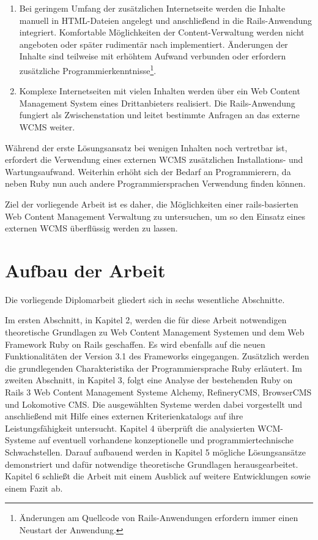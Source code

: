 \begin{enumerate}
\item{
Bei geringem Umfang der zusätzlichen Internetseite werden die Inhalte manuell in HTML-Dateien angelegt und anschließend in die Rails-Anwendung integriert. Komfortable Möglichkeiten der Content-Verwaltung werden nicht angeboten oder später rudimentär nach implementiert. Änderungen der Inhalte sind teilweise mit erhöhtem Aufwand verbunden oder erfordern zusätzliche Programmierkenntnisse\footnote{Änderungen am Quellcode von Rails-Anwendungen erfordern immer einen Neustart der Anwendung.}.
}

\item{
Komplexe Internetseiten mit vielen Inhalten werden über ein Web Content Management System eines Drittanbieters realisiert. Die Rails-Anwendung fungiert als Zwischenstation und leitet bestimmte Anfragen an das externe WCMS weiter.
}
\end{enumerate}

Während der erste Lösungsansatz bei wenigen Inhalten noch vertretbar ist, erfordert die Verwendung eines externen WCMS zusätzlichen Installations- und Wartungsaufwand. Weiterhin erhöht sich der Bedarf an Programmierern, da neben Ruby nun auch andere Programmiersprachen Verwendung finden können.

Ziel der vorliegende Arbeit ist es daher, die Möglichkeiten einer rails-basierten Web Content Management Verwaltung zu untersuchen, um so den Einsatz eines externen WCMS überflüssig werden zu lassen.



\section{Aufbau der Arbeit}
Die vorliegende Diplomarbeit gliedert sich in sechs wesentliche Abschnitte.

Im ersten Abschnitt, in Kapitel 2, werden die für diese Arbeit notwendigen theoretische Grundlagen zu Web Content Management Systemen und dem Web Framework Ruby on Rails geschaffen. Es wird ebenfalls auf die neuen Funktionalitäten der Version 3.1 des Frameworks eingegangen. Zusätzlich werden die grundlegenden Charakteristika der Programmiersprache Ruby erläutert.
Im zweiten Abschnitt, in Kapitel 3, folgt eine Analyse der bestehenden Ruby on Rails 3 Web Content Management Systeme Alchemy, RefineryCMS, BrowserCMS und Lokomotive CMS. Die ausgewählten Systeme werden dabei vorgestellt und anschließend mit Hilfe eines externen Kriterienkatalogs auf ihre Leistungsfähigkeit untersucht.
Kapitel 4 überprüft die analysierten WCM-Systeme auf eventuell vorhandene konzeptionelle und programmiertechnische Schwachstellen.
Darauf aufbauend werden in Kapitel 5 mögliche Lösungsansätze demonstriert und dafür notwendige theoretische Grundlagen herausgearbeitet.
Kapitel 6 schließt die Arbeit mit einem Ausblick auf weitere Entwicklungen sowie einem Fazit ab.
%
%

